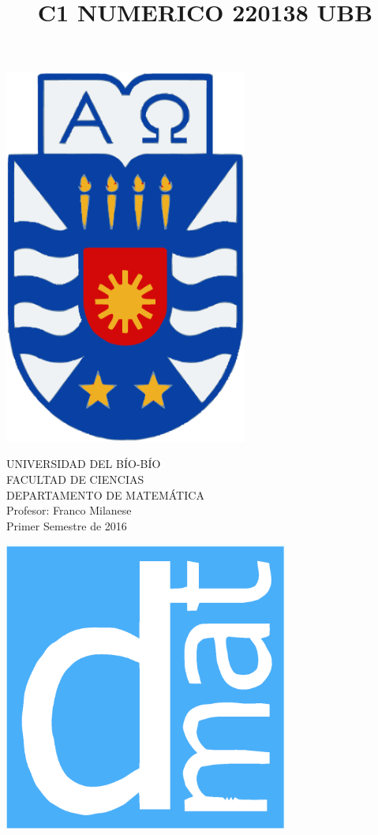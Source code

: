 \documentclass[11pt]{article}
\begin{document}
\title{C1 NUMERICO 220138 UBB}

{\begin{minipage}{2cm}
\hspace*{1cm}\includegraphics[width=0.6\textwidth]{escubo-ubb.eps}
\end{minipage}
\begin{minipage}{12cm}
\small
{\bf \rm 
{
\begin{center}
{\footnotesize UNIVERSIDAD DEL B\'IO-B\'IO} \\
{\scriptsize FACULTAD DE CIENCIAS}  \\
{\scriptsize DEPARTAMENTO DE MATEM\'ATICA}  \\
{\scriptsize Profesor:  Franco Milanese}\\
{\scriptsize Primer Semestre de 2016}
\end{center}
}}
\end{minipage}}
{\begin{minipage}{2cm}
\hspace*{-0.5cm}\vspace*{-0.05cm}\includegraphics[width=0.7\textwidth]{escudo-dmat.eps}
\end{minipage}}
\end{document}
